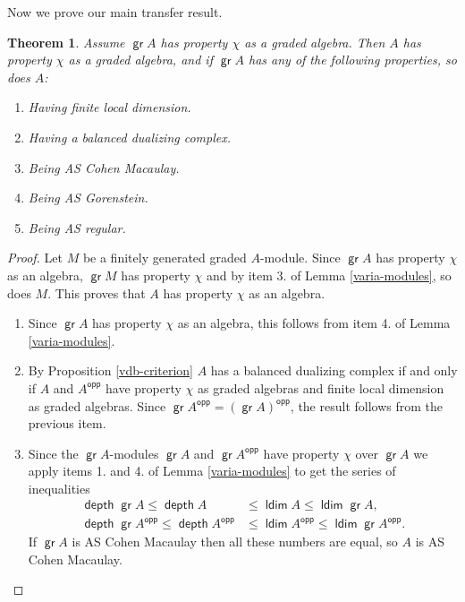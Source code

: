 \documentclass[11pt,fleqn]{article}
\theoremstyle{plain}
\newtheorem{Theorem}{Theorem}[section]
\theoremstyle{remark}
\theoremstyle{definition}
\newcommand\opp{\mathsf{opp}}
\DeclareMathOperator\gr{\mathsf{gr}}
\DeclareMathOperator\ldim{\mathsf{ldim}}
\DeclareMathOperator\depth{\mathsf{depth}}
\begin{document}
Now we prove our main transfer result. 
\begin{Theorem}
\label{AS-transfer}
Assume $\gr A$ has property $\chi$ as a graded algebra. Then $A$ has property $\chi$ as
a graded algebra, and if $\gr A$ has any of the following properties, so does $A$:
	\begin{enumerate}
		\item Having finite local dimension.
		\item Having a balanced dualizing complex.
		\item Being AS Cohen Macaulay.
		\item Being AS Gorenstein.
 		\item Being AS regular.
	\end{enumerate}
\end{Theorem}
\begin{proof}
  Let $M$ be a finitely generated graded $A$-module. Since $\gr A$ has property $\chi$ as
  an algebra, $\gr M$ has property $\chi$ and by item 3. of Lemma \ref{varia-modules}, so
  does $M$. This proves that $A$ has property $\chi$ as an algebra.
  \begin{enumerate}
    \item Since $\gr A$ has property $\chi$ as an algebra, this follows from item 4. of 
    Lemma \ref{varia-modules}. 
	
    \item By Proposition \ref{vdb-criterion} $A$ has a balanced dualizing complex if and
    only if $A$ and $A^\opp$ have property $\chi$ as graded algebras and finite local 
    dimension as graded algebras. Since $\gr A^\opp = (\gr A)^\opp$, the result follows
    from the previous item.

    \item Since the $\gr A$-modules $\gr A$ and $\gr A^\opp$ have property $\chi$ over
    $\gr A$ we apply items 1. and 4. of Lemma \ref{varia-modules} to get the series of
    inequalities
    \begin{align*} 
      \depth \gr A \leq \depth A &\leq \ldim A \leq \ldim \gr A,\\
      \depth \gr A^\opp \leq \depth A^\opp &\leq \ldim A^\opp \leq \ldim \gr A^\opp.
    \end{align*}
    If $\gr A$ is AS Cohen Macaulay then all these numbers are equal, so $A$ is AS Cohen
    Macaulay.


\end{enumerate}
\end{proof}
\end{document}
